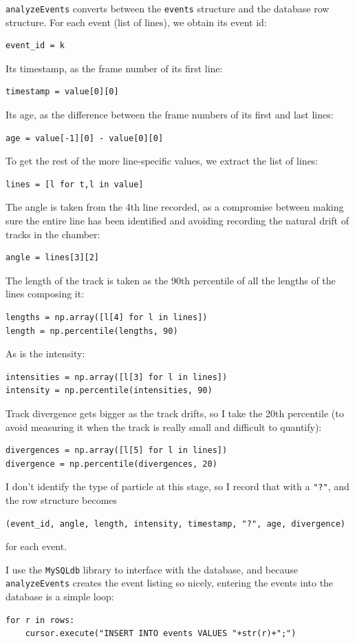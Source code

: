 \documentclass[notitlepage]{article}
\begin{document}
\texttt{analyzeEvents} converts between the \texttt{events} structure and the database row structure.  For each event (list of lines), we obtain its event id:
\begin{lstlisting}
event_id = k
\end{lstlisting}
Its timestamp, as the frame number of its first line:
\begin{lstlisting}
timestamp = value[0][0]
\end{lstlisting}
Its age, as the difference between the frame numbers of its first and last lines:
\begin{lstlisting}
age = value[-1][0] - value[0][0]
\end{lstlisting}
To get the rest of the more line-specific values, we extract the list of lines:
\begin{lstlisting}
lines = [l for t,l in value]
\end{lstlisting}
The angle is taken from the 4th line recorded, as a compromise between making sure the entire line has been identified and avoiding recording the natural drift of tracks in the chamber:
\begin{lstlisting}
angle = lines[3][2]
\end{lstlisting}
The length of the track is taken as the 90th percentile of all the lengths of the lines composing it:
\begin{lstlisting}
lengths = np.array([l[4] for l in lines])
length = np.percentile(lengths, 90)
\end{lstlisting}
As is the intensity:
\begin{lstlisting}
intensities = np.array([l[3] for l in lines])
intensity = np.percentile(intensities, 90)
\end{lstlisting}
Track divergence gets bigger as the track drifts, so I take the 20th percentile (to avoid measuring it when the track is really small and difficult to quantify):
\begin{lstlisting}
divergences = np.array([l[5] for l in lines])
divergence = np.percentile(divergences, 20)
\end{lstlisting}
I don't identify the type of particle at this stage, so I record that with a \texttt{"?"}, and the row structure becomes
\begin{lstlisting}
(event_id, angle, length, intensity, timestamp, "?", age, divergence)
\end{lstlisting}
for each event.

I use the \texttt{MySQLdb} library to interface with the database, and because \texttt{analyzeEvents} creates the event listing so nicely, entering the events into the database is a simple loop:
\begin{lstlisting}
for r in rows:
    cursor.execute("INSERT INTO events VALUES "+str(r)+";")
\end{lstlisting}
\end{document}
